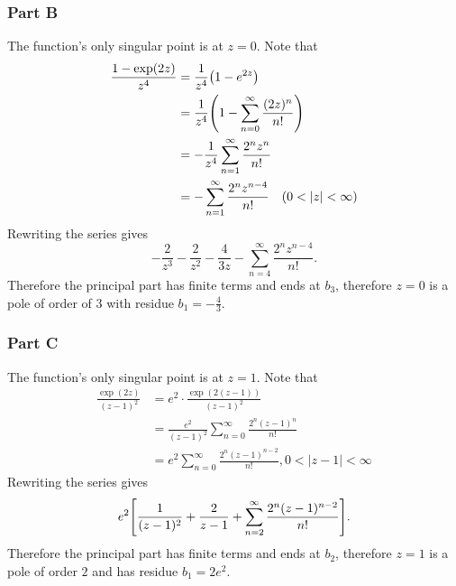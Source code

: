 \documentclass[12pt]{extarticle}
\begin{document}
\begin{problem} \subsubsection*{Part B}
    The function's only singular point is at $z=0$. Note that
    \begin{align*}
        \frac{1-\exp(2z)}{z^4} &= \frac{1}{z^4}\qty(1 - e^{2z}) \\
        &= \frac{1}{z^4} \qty(1 - \sum_{n=0}^\infty \frac{(2z)^n}{n!}) \\
        &= -\frac{1}{z^4} \sum_{n=1}^\infty \frac{2^n z^n}{n!} \\
        &= -\sum_{n=1}^\infty \frac{2^n z^{n-4}}{n!} \hspace{1em} (0 < |z| < \infty)
    \end{align*}
    Rewriting the series gives
    \[
        -\frac{2}{z^3} - \frac{2}{z^2} - \frac{4}{3z} - \sum_{n=4}^\infty \frac{2^n z^{n-4}}{n!}
    .\]
    Therefore the principal part has finite terms and ends at $b_3$, therefore $z = 0$ is a pole of order of $3$ with residue $b_1 = -\frac{4}{3}$.
\end{problem}

\begin{problem} \subsubsection*{Part C}
    The function's only singular point is at $z=1$. Note that
    \begin{align*}
        \frac{\exp(2z)}{(z-1)^2} &= e^2 \cdot \frac{\exp(2(z-1))}{(z-1)^2} \\
        &= \frac{e^2}{(z-1)^2} \sum_{n=0}^\infty \frac{2^n (z-1)^n}{n!} \\
        &= e^2 \sum_{n=0}^\infty \frac{2^n (z-1)^{n-2}}{n!}, 0 < |z-1| < \infty
    \end{align*}
    Rewriting the series gives
    \[
        e^2 \qty[
        \frac{1}{(z-1)^2} + \frac{2}{z-1} + \sum_{n=2}^\infty \frac{2^n (z-1)^{n-2}}{n!}
        ]
    .\]
    Therefore the principal part has finite terms and ends at $b_2$, therefore $z=1$ is a pole of order $2$ and has residue $b_1 = 2 e^2$.
\end{problem}
\end{document}
